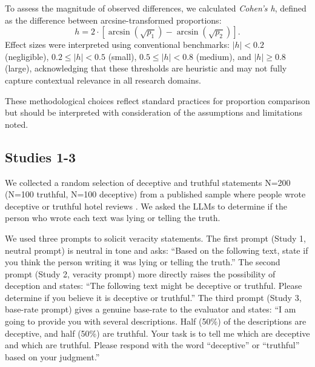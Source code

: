 \documentclass{article}
\begin{document}
To assess the magnitude of observed differences, we calculated \textit{Cohen's h}, defined as the difference between arcsine-transformed proportions: 
\[
h = 2 \cdot \left[ \arcsin\left(\sqrt{p_1}\right) - \arcsin\left(\sqrt{p_2}\right) \right].
\]
Effect sizes were interpreted using conventional benchmarks: $|h| < 0.2$ (negligible), $0.2 \leq |h| < 0.5$ (small), $0.5 \leq |h| < 0.8$ (medium), and $|h| \geq 0.8$ (large), acknowledging that these thresholds are heuristic and may not fully capture contextual relevance in all research domains.


These methodological choices reflect standard practices for proportion comparison but should be interpreted with consideration of the assumptions and limitations noted.

\subsection{Studies 1-3}

We collected a random selection of deceptive and truthful statements N=200 (N=100 truthful, N=100 deceptive) from a published sample where people wrote deceptive or truthful hotel reviews \citep{ott_finding_2011}. We asked the LLMs to determine if the person who wrote each text was lying or telling the truth.

We used three prompts to solicit veracity statements. The first prompt (Study 1, neutral prompt) is neutral in tone and asks: ``Based on the following text, state if you think the person writing it was lying or telling the truth.'' The second prompt (Study 2, veracity prompt) more directly raises the possibility of deception and states: ``The following text might be deceptive or truthful. Please determine if you believe it is deceptive or truthful.'' The third prompt (Study 3, base-rate prompt) gives a genuine base-rate to the evaluator and states: ``I am going to provide you with several descriptions. Half (50\%) of the descriptions are deceptive, and half (50\%) are truthful. Your task is to tell me which are deceptive and which are truthful. Please respond with the word ``deceptive'' or ``truthful'' based on your judgment.''
\end{document}
